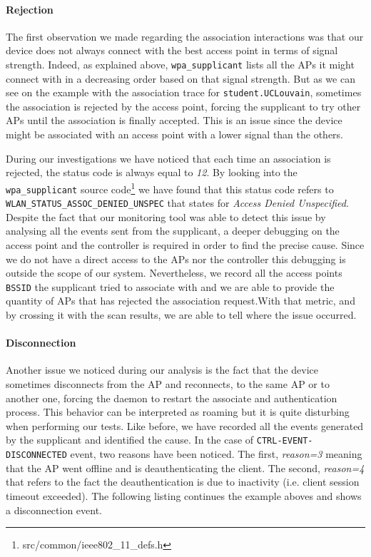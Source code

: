 \paragraph*{Rejection} The first observation we made regarding the association interactions was that our device does not always connect with the best access point in terms of signal strength. Indeed, as explained above, \texttt{wpa\_supplicant} lists all the APs it might connect with in a decreasing order based on that signal strength. But as we can see on the example with the association trace for \texttt{student.UCLouvain}, sometimes the association is rejected by the access point, forcing the supplicant to try other APs until the association is finally accepted. This is an issue since the device might be associated with an access point with a lower signal than the others.

During our investigations we have noticed that each time an association is rejected, the status code is always equal to \textit{12}. By looking into the \texttt{wpa\_supplicant} source code\footnote{src/common/ieee802\_11\_defs.h} we have found that this status code refers to \texttt{WLAN\_STATUS\_ASSOC\_DENIED\_UNSPEC} that states for \emph{Access Denied Unspecified}. Despite the fact that our monitoring tool was able to detect this issue by analysing all the events sent from the supplicant, a deeper debugging on the access point and the controller is required in order to find the precise cause. Since we do not have a direct access to the APs nor the controller this debugging is outside the scope of our system. Nevertheless, we record all the access points \texttt{BSSID} the supplicant tried to associate with and we are able to provide the quantity of APs that has rejected the association request.With that metric, and by crossing it with the scan results, we are able to tell where the issue occurred.


\paragraph*{Disconnection} Another issue we noticed during our analysis is the fact that the device sometimes disconnects from the AP and reconnects, to the same AP or to another one, forcing the daemon to restart the associate and authentication process. This behavior can be interpreted as roaming but it is quite disturbing when performing our tests. Like before, we have recorded all the events generated by the supplicant and identified the cause. In the case of \texttt{CTRL-EVENT-DISCONNECTED} event, two reasons have been noticed. The first, \textit{reason=3} meaning that the AP went offline and is deauthenticating the client. The second, \textit{reason=4} that refers to the fact the deauthentication is due to inactivity (i.e. client session timeout exceeded). The following listing continues the example aboves and shows a disconnection event.\\

